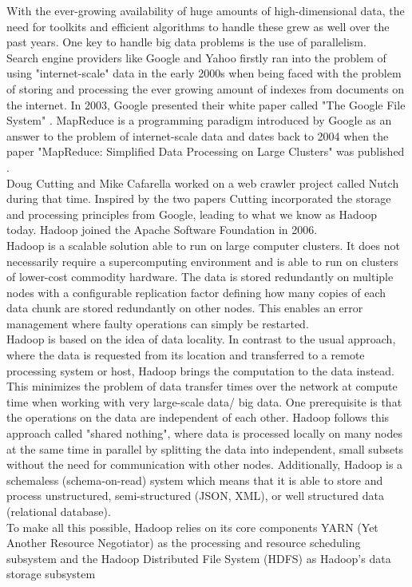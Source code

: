 With the ever-growing availability of huge amounts of high-dimensional data, the need for toolkits and efficient algorithms to handle these grew as well over the past years. One key to handle big data problems is the use of parallelism.\\
Search engine providers like Google and Yahoo firstly ran into the problem of using "internet-scale" data in the early 2000s when being faced with the problem of storing and processing the ever growing amount of indexes from documents on the internet. In 2003, Google presented their white paper called "The Google File System" \cite{gfs}. MapReduce is a programming paradigm introduced by Google as an answer to the problem of internet-scale data and dates back to 2004 when the paper "MapReduce: Simplified Data Processing on Large Clusters" was published \cite{mapreduce1}.\\ 
Doug Cutting and Mike Cafarella worked on a web crawler project called Nutch during that time. Inspired by the two papers Cutting incorporated the storage and processing principles from Google, leading to what we know as Hadoop today. Hadoop joined the Apache Software Foundation in 2006. \cite[p. 6]{sparkbook1}\\ 
Hadoop is a scalable solution able to run on large computer clusters. It does not necessarily require a supercomputing environment and is able to run on clusters of lower-cost commodity hardware. The data is stored redundantly on multiple nodes with a configurable replication factor defining how many copies of each data chunk are stored redundantly on other nodes. This enables an error management where faulty operations can simply be restarted.\\
Hadoop is based on the idea of data locality. In contrast to the usual approach, where the data is requested from its location and transferred to a remote processing system or host, Hadoop brings the computation to the data instead. This minimizes the problem of data transfer times over the network at compute time when working with very large-scale data/ big data. One prerequisite is that the operations on the data are independent of each other. Hadoop follows this approach called "shared nothing", where data is processed locally on many nodes at the same time in parallel by splitting the data into independent, small subsets without the need for communication with other nodes. Additionally, Hadoop is a schemaless (schema-on-read) system which means that it is able to store and process unstructured, semi-structured (JSON, XML), or well structured data (relational database). \cite[p. 7]{sparkbook1}\\
To make all this possible, Hadoop relies on its core components YARN (Yet Another Resource Negotiator) as the processing and resource scheduling subsystem and the Hadoop Distributed File System (HDFS) as Hadoop's data storage subsystem\\

